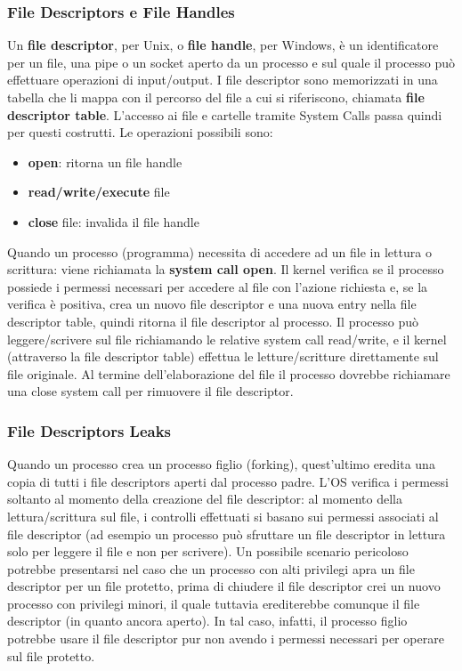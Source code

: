 \subsubsection{File Descriptors e File Handles}
Un \textbf{file descriptor}, per Unix, o \textbf{file handle}, per Windows, è un identificatore per un file, una pipe o un socket aperto da un processo e sul quale il processo può effettuare operazioni di input/output. I file descriptor sono memorizzati in una tabella che li mappa con il percorso del file a cui si riferiscono, chiamata \textbf{file descriptor table}. L'accesso ai file e cartelle tramite System Calls passa quindi per questi costrutti. Le operazioni possibili sono:
\begin{itemize}
  \item \textbf{open}: ritorna un file handle
  \item \textbf{read/write/execute} file
  \item \textbf{close} file: invalida il file handle
\end{itemize}
Quando un processo (programma) necessita di accedere ad un file in lettura o scrittura: viene richiamata la \textbf{system call open}. Il kernel verifica se il processo possiede i permessi necessari per accedere al file con l'azione richiesta e, se la verifica è positiva, crea un nuovo file descriptor e una nuova entry nella file descriptor table, quindi ritorna il file descriptor al processo. Il processo può leggere/scrivere sul file richiamando le relative system call read/write, e il kernel (attraverso la file descriptor table) effettua le letture/scritture direttamente sul file originale. Al termine dell'elaborazione del file il processo dovrebbe richiamare una close system call
per rimuovere il file descriptor.

\subsubsection{File Descriptors Leaks}
Quando un processo crea un processo figlio (forking), quest'ultimo eredita una copia di tutti i file descriptors aperti dal processo padre. L'OS verifica i permessi soltanto al momento della creazione del file descriptor: al momento della lettura/scrittura sul file, i controlli effettuati si basano sui permessi associati al file descriptor (ad esempio un processo può sfruttare un file descriptor in lettura solo per leggere il file e non per scrivere). Un possibile scenario pericoloso potrebbe presentarsi nel caso che un processo con alti privilegi apra un file descriptor per un file protetto, prima di chiudere il file descriptor crei un nuovo processo con privilegi minori, il quale tuttavia erediterebbe comunque il file descriptor (in quanto ancora aperto). In tal caso, infatti, il processo figlio potrebbe usare il file descriptor pur non avendo i permessi necessari per operare sul file protetto.

